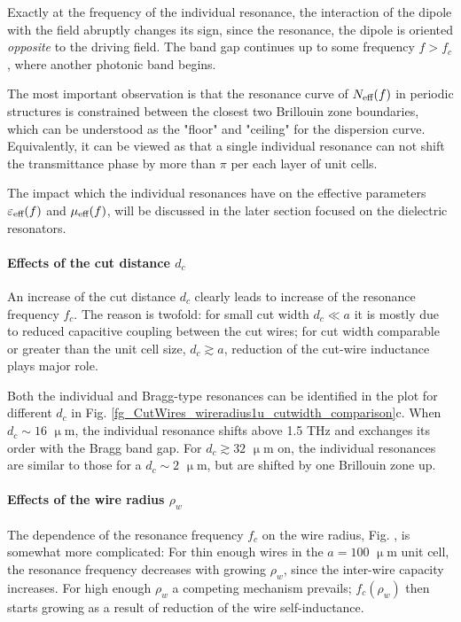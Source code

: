 Exactly at the frequency of the individual resonance, the interaction of the dipole with the field abruptly changes its sign, since the resonance, the dipole is oriented \textit{opposite} to the driving field. The band gap continues up to some frequency $f > f_c$, where another photonic band begins. 

The most important observation is that the resonance curve of $N_{\text{eff} }(f)$ in periodic structures is constrained between the closest two Brillouin zone boundaries, which can be understood as the "floor" and "ceiling" for the dispersion curve. Equivalently, it can be viewed as that a single individual resonance can not shift the transmittance phase by more than $\pi$ per each layer of unit cells. 

The impact which the individual resonances  have on the effective parameters $\varepsilon_{\text{eff} }(f)$ and $\mu_{\text{eff} }(f)$, will be discussed in the later section focused on the dielectric resonators.

\paragraph{Effects of the cut distance $d_c$}
An increase of the cut distance $d_c$ clearly leads to increase of the resonance frequency $f_c$. The reason is twofold: for small cut width $d_c\ll a$ it is mostly due to reduced capacitive coupling between the cut wires; for cut width comparable or greater than the unit cell size, $d_c \gtrsim a$, reduction of the cut-wire inductance plays major role.

Both the individual and Bragg-type resonances can be identified in the plot for different $d_c$ in Fig. \ref{fg_CutWires_wireradius1u_cutwidth_comparison}c. When $d_c \sim 16$  $\upmu$m, the individual resonance shifts above 1.5 THz and exchanges its order with the Bragg band gap. 
For $d_c \gtrsim 32$  $\upmu$m on, the individual resonances are similar to those for a $d_c\sim 2$ $\upmu$m, but are shifted by one Brillouin zone up.

\paragraph{Effects of the wire radius $\rho_w$}
The dependence of the resonance frequency $f_c$ on the wire radius, Fig. \label{fg_CutWires_wirecut2um_wireradiusscan}, is somewhat more complicated: For thin enough wires in the $a=100$ $\upmu$m unit cell, the resonance frequency decreases with growing $\rho_w$, since the inter-wire capacity increases. 
For high enough $\rho_w$ a competing mechanism prevails; $f_c(\rho_w)$ then starts growing as a result of reduction of the wire self-inductance.

